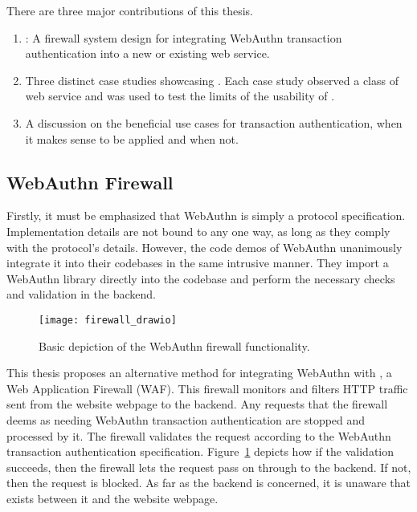 There are three major contributions of this thesis. 

\begin{enumerate}[nosep]

\item \sys{}: A firewall system design for integrating WebAuthn transaction authentication into a new or existing web service.

\item Three distinct case studies showcasing \sys{}. Each case study observed a class of web service and was used to test the limits of the usability of \sys{}.

\item A discussion on the beneficial use cases for transaction authentication, when it makes sense to be applied and when not.

\end{enumerate}


\subsection{WebAuthn Firewall}

Firstly, it must be emphasized that WebAuthn is simply a protocol specification. Implementation details are not bound to any one way, as long as they comply with the protocol's details. However, the code demos of WebAuthn unanimously integrate it into their codebases in the same intrusive manner. They import a WebAuthn library \cite{webauthn-library} directly into the codebase and perform the necessary checks and validation in the backend.

\begin{figure}[h]
  \centering
  \texttt{[image: firewall\_drawio]}
  \caption{Basic depiction of the WebAuthn firewall functionality.}
  \label{Fig:BasicFirewallDepiction}
\end{figure}

This thesis proposes an alternative method for integrating WebAuthn with \sys{}, a Web Application Firewall (WAF). This firewall monitors and filters HTTP traffic sent from the website webpage to the backend. Any requests that the firewall deems as needing WebAuthn transaction authentication are stopped and processed by it. The firewall validates the request according to the WebAuthn transaction authentication specification. Figure~\ref{Fig:BasicFirewallDepiction} depicts how if the validation succeeds, then the firewall lets the request pass on through to the backend. If not, then the request is blocked. As far as the backend is concerned, it is unaware that \sys{} exists between it and the website webpage. 

